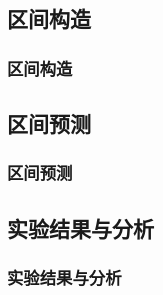 \subsection{区间构造}

\begin{frame}
\frametitle{区间构造}
\end{frame}


\subsection{区间预测}

\begin{frame}
\frametitle{区间预测}
\end{frame}


\subsection{实验结果与分析}

\begin{frame}
\frametitle{实验结果与分析}
\end{frame}